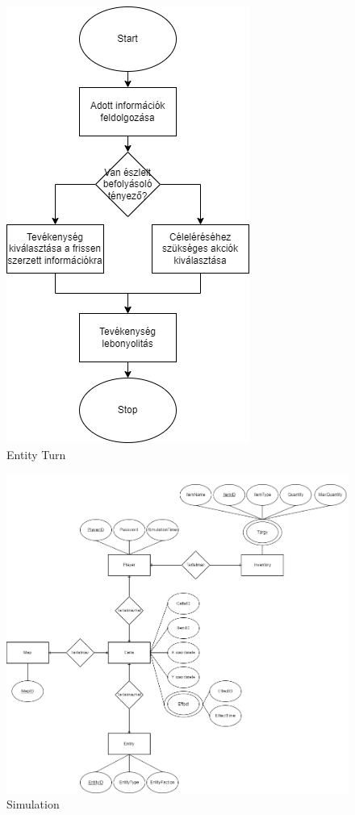 \begin{figure}[!ht]
	\centering
	\includegraphics[scale=1]{images/entityturnUML.png}
	\caption{Entity Turn}
	\label{fig:entityturn}
\end{figure}

\begin{figure}[!ht]
	\centering
	\includegraphics[scale=0.4]{images/simulationER.png}
	\caption{Simulation}
	\label{fig:simulation}
\end{figure}

